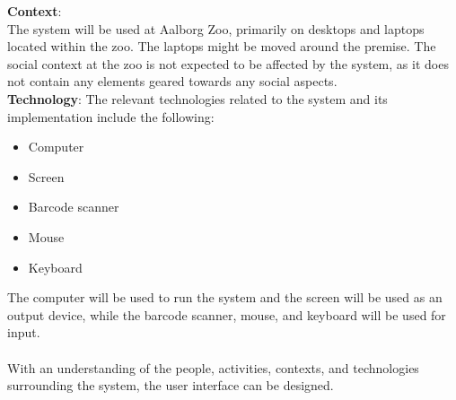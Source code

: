 \textbf{Context}: \\
The system will be used at Aalborg Zoo, primarily on desktops and laptops located within the zoo. The laptops might be moved around the premise. The social context at the zoo is not expected to be affected by the system, as it does not contain any elements geared towards any social aspects.\\
 
\textbf{Technology}:
The relevant technologies related to the system and its implementation include the following:

\begin{itemize}
    \setlength\itemsep{0.05em}
    \item Computer
    \item Screen
    \item Barcode scanner
    \item Mouse
    \item Keyboard
\end{itemize}

The computer will be used to run the system and the screen will be used as an output device, while the barcode scanner, mouse, and keyboard will be used for input. %
\\\\
With an understanding of the people, activities, contexts, and technologies surrounding the system, the user interface can be designed.
\newpage